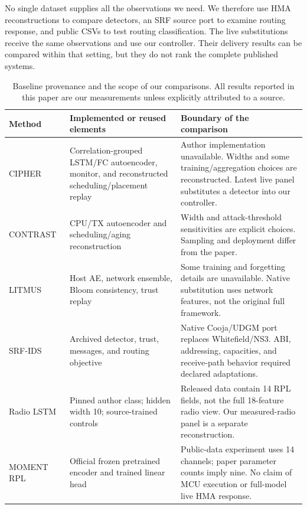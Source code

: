 \documentclass[journal]{IEEEtran}
\begin{document}
No single dataset supplies all the observations we need. We therefore use HMA reconstructions to compare detectors, an SRF source port to examine routing response, and public CSVs to test routing classification. The live substitutions receive the same observations and use our controller. Their delivery results can be compared within that setting, but they do not rank the complete published systems.

\begin{table}[t]
\caption{Baseline provenance and the scope of our comparisons. All results reported in this paper are our measurements unless explicitly attributed to a source.}
\label{tab:fidelity}\centering\small
\begin{tabularx}{\textwidth}{>{\raggedright\arraybackslash}p{2.1cm}>{\raggedright\arraybackslash}p{4.7cm}>{\raggedright\arraybackslash}X}
\toprule Method & Implemented or reused elements & Boundary of the comparison \\
\midrule
CIPHER~\cite{sanyal2026cipher} & Correlation-grouped LSTM/FC autoencoder, monitor, and reconstructed scheduling/placement replay & Author implementation unavailable. Widths and some training/aggregation choices are reconstructed. Latest live panel substitutes a detector into our controller. \\
CONTRAST~\cite{contrast} & CPU/TX autoencoder and scheduling/aging reconstruction & Width and attack-threshold sensitivities are explicit choices. Sampling and deployment differ from the paper. \\
LITMUS~\cite{sanyal2026litmus} & Host AE, network ensemble, Bloom consistency, trust replay & Some training and forgetting details are unavailable. Native substitution uses network features, not the original full framework. \\
SRF-IDS~\cite{srf,srfcode} & Archived detector, trust, messages, and routing objective & Native Cooja/UDGM port replaces Whitefield/NS3. ABI, addressing, capacities, and receive-path behavior required declared adaptations. \\
Radio LSTM~\cite{radio,radiocode} & Pinned author class; hidden width 10; source-trained controls & Released data contain 14 RPL fields, not the full 18-feature radio view. Our measured-radio panel is a separate reconstruction. \\
MOMENT RPL~\cite{foundation,momentcode} & Official frozen pretrained encoder and trained linear head & Public-data experiment uses 14 channels; paper parameter counts imply nine. No claim of MCU execution or full-model live HMA response. \\
\bottomrule
\end{tabularx}
\end{table}
\end{document}
